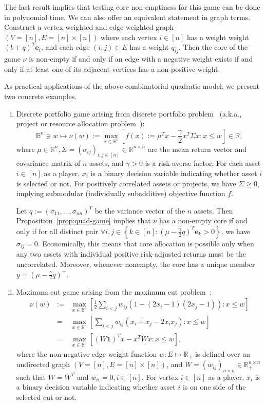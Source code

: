 \documentclass[11pt]{article}\usepackage[]{graphicx}\usepackage[]{xcolor}
\begin{document}
The last result implies that testing core non-emptiness for this game can be done in polynomial time. We can also offer an equivalent statement in graph terms. Construct a vertex-weighted and edge-weighted graph $(V=[n], E=[n]\times [n])$ where each vertex $i\in [n]$ has a weight weight $(b+q)^T\mathbf{e}_i$, and each edge $(i,j)\in E$ has a weight $q_{ij}$. Then the core of the game $\nu$ is non-empty if and only if an edge with a negative weight exists if and only if at least one of its adjacent vertices has a non-positive weight. 



As practical applications of the above combinatorial quadratic model, we present two concrete examples.  
\begin{enumerate}[(i)]
\item Discrete portfolio game arising from discrete portfolio problem~\citep{olszewski2014selecting} (a.k.a., project or resource allocation problem~\citep{IbarakiKatoh1988}): 
\[
\mathbb{B}^n\ni w\mapsto \nu(w):=\max_{x\in \mathbb{B}^n}\left[f(x):=\mu^Tx-\frac{\gamma}{2}x^T\Sigma x: x\le w\right]\in\mathbb{R},
\]
where $\mu\in\mathbb{R}^n, \Sigma=(\sigma_{ij})_{i,j\in [n]}\in\mathbb{R}^{n\times n}$ are the mean return vector and covariance matrix of $n$ assets, and $\gamma>0$ is a risk-averse factor. For each asset $i\in [n]$ as a player, $x_i$ is a binary decision variable indicating whether asset $i$ is selected or not. For positively correlated assets or projects, we have $\Sigma\ge 0$, implying submodular (individually subadditive) objective function $f$. 

Let $q:=(\sigma_{11},\dots, \sigma_{nn})^T$ be the variance vector of the $n$ assets. Then Proposition~\ref{prop:quad-game} implies that $\nu$ has a non-empty core if and only if for all distinct pair
$\forall i, j\in \left\{k\in [n]: \left(\mu-\frac{\gamma}{2}q\right)^T\mathbf{e}_k>0\right\}$, we have $\sigma_{ij}=0$. Economically, this means that core allocation is possible only when any two assets with individual positive risk-adjusted returns must be the uncorrelated. Moreover, whenever nonempty, the core has a unique member $y=\left(\mu-\frac{\gamma}{2}q\right)^{+}$.

\item Maximum cut game arising from the maximum cut problem~\citep{goemans1995improved}: 
\begin{eqnarray*}
\nu(w)&:=&\max\limits_{x\in\mathbb{B}^n} \left[\frac{1}{2}\sum_{i<j}w_{ij}\left(1-(2x_i-1)(2x_j-1) \right): x\le w\right]\\
&=&\max\limits_{x\in\mathbb{B}^n} \left[\sum_{i<j}w_{ij}\left(x_i+x_j-2x_ix_j\right): x\le w\right]\\
&=&\max\limits_{x\in\mathbb{B}^n} \left[(W\mathbf{1})^Tx-x^TWx: x\le w\right],
\end{eqnarray*}
where the non-negative edge weight function $w: E\mapsto \mathbb{R}_{+}$ is defined over an undirected graph $(V=[n],E=[n]\times [n])$, and $W=(w_{ij})_{n\times n}\in\mathbb{R}^{n\times n}_{+}$ such that $W=W^T$ and $w_{ii}=0, i\in[n]$. For vertex $i\in [n]$ as a player, $x_i$ is a binary decision variable indicating whether asset $i$ is on one side of the selected cut or not. 


\end{enumerate}
\end{document}
